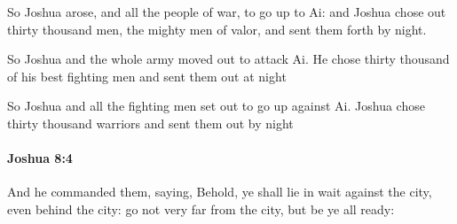 			\begin{versebox}
					\item[BHS] 
					\item[ASV] So Joshua arose, and all the people of war, to go up to Ai: and Joshua chose out thirty thousand men, the mighty men of valor, and sent them forth by night.
					\item[NIV] So Joshua and the whole army moved out to attack Ai. He chose thirty thousand of his best fighting men and sent them out at night
					\item[NRSV] So Joshua and all the fighting men set out to go up against Ai. Joshua chose thirty thousand warriors and sent them out by night
			\end{versebox}

		\paragraph{Joshua 8:4} %
			\label{JOSHUA-8-4}

			And he commanded them, saying, Behold, ye shall lie in wait against the city, even behind the city: go not very far from the city, but be ye all ready:

